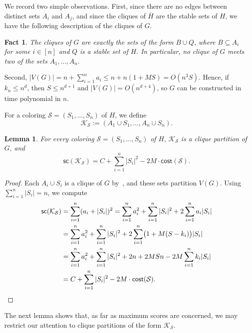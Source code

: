 \documentclass[a4paper,fleqn]{cas-sc}
\newtheorem{lem}[thm]{Lemma}
\newtheorem{fact}[thm]{Fact}
\theoremstyle{remark}
\theoremstyle{plain}
\newcommand{\cost}{{\mathsf{cost}}}
\newcommand{\score}{{\mathsf{sc}}}
\begin{document}
We record two simple observations. First, since there are no edges between distinct sets $A_i$ and $A_j$, and since the cliques of $\overline{H}$ are the stable sets of $H$, we have the following description of the cliques of $G$.

\begin{fact} \label{fact:cliques-of-G}
    The cliques of $G$ are exactly the sets of the form $B \cup Q$, where $B \subseteq A_i$ for some $i\in[n]$ and $Q$ is a stable set of $H$.  In particular, no clique of $G$ meets two of the sets $A_1, \dots, A_n$.
\end{fact}

Second, $|V(G)| = n + \sum_{i=1}^n a_i \leq n + n(1+MS) = O(n^3 S)$.  Hence, if $k_n \leq n^d$, then $S \leq n^{d+1}$ and $|V(G)|=O(n^{d+4})$, so $G$ can be constructed in time polynomial in $n$.

For a coloring $\mathcal{S}=(S_1, \dots, S_n)$ of $H$, we define
\[
    \mathcal{K}_{\mathcal{S}} := (A_1 \cup S_1, \dots, A_n \cup S_n).
\]

\begin{lem} \label{lem:score-of-coloring}
    For every coloring $\mathcal{S}=(S_1, \dots, S_n)$ of $H$, $\mathcal{K}_{\mathcal{S}}$ is a clique partition of $G$, and
    \[
        \score(\mathcal{K}_{\mathcal{S}}) = C + \sum_{i=1}^n |S_i|^2 - 2M \cdot \cost(\mathcal{S}).
    \]
\end{lem}

\begin{proof}
    Each $A_i \cup S_i$ is a clique of $G$ by~, and these sets partition $V(G)$.  Using $\sum_{i=1}^n |S_i| = n$, we compute
    \begin{align*}
        \score(\mathcal{K}_{\mathcal{S}})
        &= \sum_{i=1}^n (a_i + |S_i|)^2
         = \sum_{i=1}^n a_i^2 + \sum_{i=1}^n |S_i|^2 + 2\sum_{i=1}^n a_i |S_i| \\
        &= \sum_{i=1}^n a_i^2 + \sum_{i=1}^n |S_i|^2 + 2\sum_{i=1}^n \bigl(1 + M(S-k_i)\bigr)|S_i| \\
        &= \sum_{i=1}^n a_i^2 + \sum_{i=1}^n |S_i|^2 + 2n + 2MSn - 2M\sum_{i=1}^n k_i|S_i| \\
        &= C + \sum_{i=1}^n |S_i|^2 - 2M \cdot \cost(\mathcal{S}). \qedhere
    \end{align*}
\end{proof}

The next lemma shows that, as far as maximum scores are concerned, we may restrict our attention to clique partitions of the form $\mathcal{K}_{\mathcal{S}}$.
\end{document}
